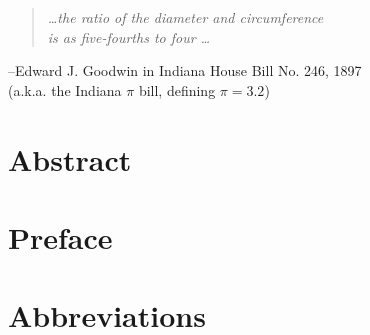 \documentclass[a4paper, 12pt, openany]{book} %
\newcommand\myemptypage{
    \null
    \thispagestyle{empty}
    \addtocounter{page}{-1}
    \newpage
    } %
\begin{document}
    
\begin{quote}
\begin{center}
    {\em \ldots the ratio of the diameter and circumference\\ 
    is as five-fourths to four \ldots}
    \end{center}
\end{quote} 
\begin{center}
--Edward J. Goodwin in  Indiana House Bill No. 246, 1897\\ (a.k.a. the Indiana $\pi$ bill, defining $\pi = 3.2$)
\end{center}
\vspace*{\fill}
\myemptypage %
\chapter*{Abstract} %
\setcounter{page}{1}

\chapter*{Preface}




\tableofcontents
{}

\listoffigures
{}
\listoftables


\chapter*{Abbreviations}

\newpage
\myemptypage
\end{document}
